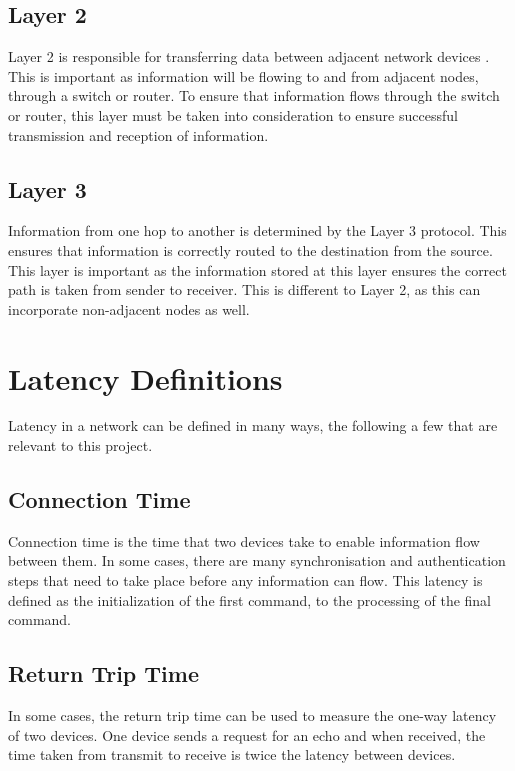 \subsection{Layer 2}

Layer 2 is responsible for transferring data between adjacent network devices \cite{IEEE802}. This is important as
information will be flowing to and from adjacent nodes, through a switch or router. To ensure that
information flows through the switch or router, this layer must be taken into consideration to ensure
successful transmission and reception of information.

\subsection{Layer 3}

Information from one hop to another is determined by the Layer 3 protocol. This ensures that
information is correctly routed to the destination from the source. This layer is important as the
information stored at this layer ensures the correct path is taken from sender to receiver. This is
different to Layer 2, as this can incorporate non-adjacent nodes as well.

\section{Latency Definitions}

Latency in a network can be defined in many ways, the following a few that are relevant to this
project.

\subsection{Connection Time}

Connection time is the time that two devices take to enable information flow between them. In
some cases, there are many synchronisation and authentication steps that need to take place before
any information can flow. This latency is defined as the initialization of the first command, to the
processing of the final command.

\subsection{Return Trip Time}

In some cases, the return trip time can be used to measure the one-way latency of two devices. One
device sends a request for an echo and when received, the time taken from transmit to receive is
twice the latency between devices.

